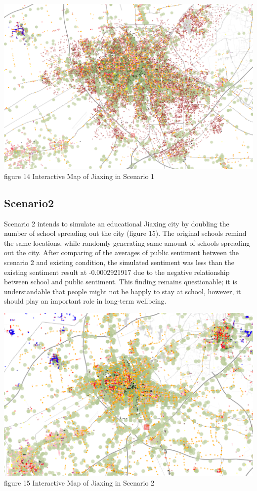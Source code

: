 \documentclass[
]{article}
\begin{document}
\href{https://WTHSYZW.github.io/Thesis_2022/jx_map_scenario1.html}{\includegraphics{maps/jx_map_scenario1.png}}
figure 14 Interactive Map of Jiaxing in Scenario 1

\hypertarget{scenario2}{%
\subsection{Scenario2}\label{scenario2}}

Scenario 2 intends to simulate an educational Jiaxing city by doubling
the number of school spreading out the city (figure 15). The original
schools remind the same locations, while randomly generating same amount
of schools spreading out the city. After comparing of the averages of
public sentiment between the scenario 2 and existing condition, the
simulated sentiment was less than the existing sentiment result at
-0.0002921917 due to the negative relationship between school and public
sentiment. This finding remains questionable; it is understandable that
people might not be happly to stay at school, however, it should play an
important role in long-term wellbeing.

\href{https://WTHSYZW.github.io/Thesis_2022/jx_map_scenario2.html}{\includegraphics{maps/jx_map_scenario2.png}}
figure 15 Interactive Map of Jiaxing in Scenario 2
\end{document}
